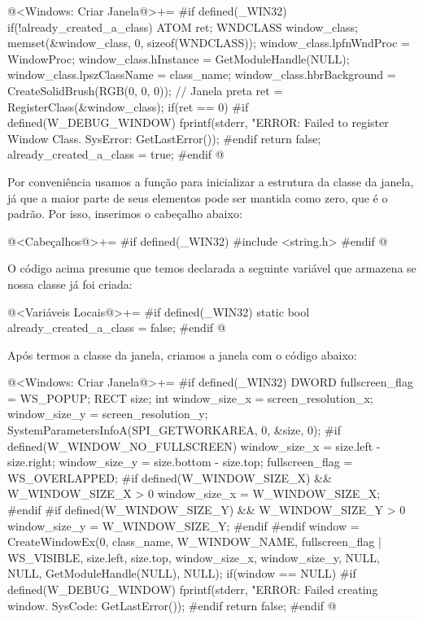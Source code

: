 \iniciocodigo
@<Windows: Criar Janela@>+=
#if defined(_WIN32)
if(!already_created_a_class){
  ATOM ret;
  WNDCLASS window_class;
  memset(&window_class, 0, sizeof(WNDCLASS));
  window_class.lpfnWndProc = WindowProc;
  window_class.hInstance = GetModuleHandle(NULL);
  window_class.lpszClassName = class_name;
  window_class.hbrBackground = CreateSolidBrush(RGB(0, 0, 0)); // Janela preta
  ret = RegisterClass(&window_class);
  if(ret == 0){
#if defined(W_DEBUG_WINDOW)
    fprintf(stderr, "ERROR: Failed to register Window Class. SysError: %
            GetLastError());
#endif
    return false;
  }
  already_created_a_class = true;
}
#endif
@
\fimcodigo

Por conveniência usamos a função  para inicializar
a estrutura da classe da janela, já que a maior parte de seus
elementos pode ser mantida como zero, que é o padrão. Por isso,
inserimos o cabeçalho abaixo:

\iniciocodigo
@<Cabeçalhos@>+=
#if defined(_WIN32)
#include <string.h>
#endif
@
\fimcodigo

O código acima presume que temos declarada a seguinte variável que
armazena se nossa classe já foi criada:

\iniciocodigo
@<Variáveis Locais@>+=
#if defined(_WIN32)
static bool already_created_a_class = false;
#endif
@
\fimcodigo

Após termos a classe da janela, criamos a janela com o código
abaixo:

\iniciocodigo
@<Windows: Criar Janela@>+=
#if defined(_WIN32)
{
  DWORD fullscreen_flag = WS_POPUP;
  RECT size;
  int window_size_x = screen_resolution_x;
  window_size_y = screen_resolution_y;
  SystemParametersInfoA(SPI_GETWORKAREA, 0, &size, 0);
#if defined(W_WINDOW_NO_FULLSCREEN)
  window_size_x = size.left - size.right;
  window_size_y = size.bottom - size.top;
  fullscreen_flag = WS_OVERLAPPED;
#if defined(W_WINDOW_SIZE_X) && W_WINDOW_SIZE_X > 0
  window_size_x = W_WINDOW_SIZE_X;
#endif
#if defined(W_WINDOW_SIZE_Y) && W_WINDOW_SIZE_Y > 0
  window_size_y = W_WINDOW_SIZE_Y;
#endif
#endif
  window = CreateWindowEx(0, class_name,
                          W_WINDOW_NAME,
                          fullscreen_flag | WS_VISIBLE,
                          size.left, size.top, window_size_x,
                          window_size_y,
                          NULL, NULL,
                          GetModuleHandle(NULL),
                          NULL);
  if(window == NULL){
#if defined(W_DEBUG_WINDOW)
    fprintf(stderr, "ERROR: Failed creating window. SysCode: %
            GetLastError());
#endif
    return false;
  }
}
#endif
@
\fimcodigo

